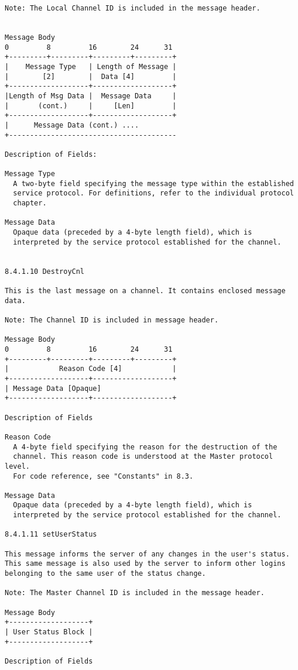 \documentclass[titlepage,oneside]{book}
\begin{document}
\begin{verbatim}
Note: The Local Channel ID is included in the message header.


Message Body
0         8         16        24      31
+---------+---------+---------+---------+
|    Message Type   | Length of Message |
|        [2]        |  Data [4]         |
+-------------------+-------------------+
|Length of Msg Data |  Message Data     |
|       (cont.)     |     [Len]         |
+-------------------+-------------------+
|      Message Data (cont.) ....
+----------------------------------------

Description of Fields:

Message Type
  A two-byte field specifying the message type within the established
  service protocol. For definitions, refer to the individual protocol
  chapter.

Message Data
  Opaque data (preceded by a 4-byte length field), which is
  interpreted by the service protocol established for the channel.


8.4.1.10 DestroyCnl

This is the last message on a channel. It contains enclosed message
data.

Note: The Channel ID is included in message header.

Message Body
0         8         16        24      31
+---------+---------+---------+---------+
|            Reason Code [4]            |
+-------------------+-------------------+
| Message Data [Opaque]
+-------------------+-------------------+

Description of Fields

Reason Code
  A 4-byte field specifying the reason for the destruction of the
  channel. This reason code is understood at the Master protocol level.
  For code reference, see "Constants" in 8.3.

Message Data
  Opaque data (preceded by a 4-byte length field), which is
  interpreted by the service protocol established for the channel.

8.4.1.11 setUserStatus

This message informs the server of any changes in the user's status.
This same message is also used by the server to inform other logins
belonging to the same user of the status change.

Note: The Master Channel ID is included in the message header.

Message Body
+-------------------+
| User Status Block |
+-------------------+

Description of Fields


\end{verbatim}
\end{document}
